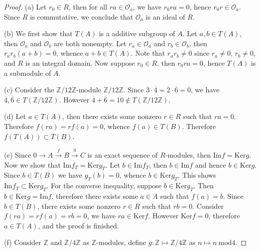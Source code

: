 \begin{proof}
(a) Let $r_0\in R$, then for all $ra\in\mathcal{O}_a$, we have $r_0ra=0$, hence $r_0r\in\mathcal{O}_a$. Since $R$ is commutative, we conclude that $\mathcal{O}_a$ is an ideal of $R$.\par
(b) We first show that $T(A)$ is a additive subgroup of $A$. Let $a,b\in T(A)$, then $\mathcal{O}_a$ and $\mathcal{O}_b$ are both nonempty. Let $r_a\in\mathcal{O}_a$ and $r_b\in\mathcal{O}_b$, then $r_ar_b(a+b)=0$, whence $a+b\in T(A)$. Note that $r_ar_b\ne 0$ since $r_a\ne 0$, $r_b\ne 0$, and $R$ is an integral domain. Now suppose $r_0\in R$, then $r_0ra=0$, hence $T(A)$ is a submodule of $A$.\par
(c) Consider the $\mathbb{Z}/12\mathbb{Z}$-module $\mathbb{Z}/12\mathbb{Z}$. Since $\overline{3}\cdot\overline{4}=\overline{2}\cdot\overline{6}=\overline{0}$, we have $\overline{4},\overline{6}\in T(\mathbb{Z}/12\mathbb{Z})$. However $\overline{4}+\overline{6}=\overline{10}\notin T(\mathbb{Z}/12\mathbb{Z})$.\par
(d) Let $a\in T(A)$, then there exists some nonzero $r\in R$ such that $ra=0$. Therefore $f(ra)=rf(a)=0$, whence $f(a)\in T(B)$. Therefore $f(T(A))\subset T(B)$.\par
(e) Since $0\longrightarrow A\overset{f}{\longrightarrow}B\overset{g}{\longrightarrow}C$ is an exact sequence of $R$-modules, then $\mathrm{Im}f=\mathrm{Ker}g$. Now we show that $\mathrm{Im}f_T=\mathrm{Ker}g_T$. Let $b\in\mathrm{Im}f_T$, then $b\in\mathrm{Im}f$ and hence $b\in\mathrm{Ker}g$. Since $b\in T(B)$ we have $g_T(b)=0$, whence $b\in\mathrm{Ker}g_T$. This shows $\mathrm{Im}f_T\subset\mathrm{Ker}g_T$. For the converse inequality, suppose $b\in\mathrm{Ker}g_T$. Then $b\in\mathrm{Ker}g=\mathrm{Im}f$, therefore there exists some $a\in A$ such that $f(a)=b$. Since $b\in T(B)$, there exists some nonzero $r\in R$ such that $rb=0$. Consider $f(ra)=rf(a)=rb=0$, we have $ra\in\mathrm{Ker}f$. However $\mathrm{Ker}f=0$, therefore $a\in T(A)$, and the proof is finished.\par
(f) Consider $\mathbb{Z}$ and $\mathbb{Z}/4\mathbb{Z}$ as $\mathbb{Z}$-modules, define $g:\mathbb{Z}\mapsto\mathbb{Z}/4\mathbb{Z}$ as $n\mapsto n\ \mathrm{mod}4$.
\end{proof}
